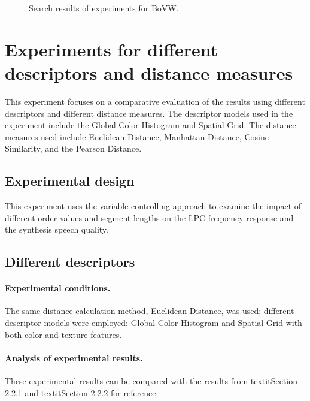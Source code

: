 \documentclass{article}
\begin{document}
\begin{figure}[!tbp]
  \centering
  \hfill
  \hfill
  \caption{\label{fig:BoVWResult} Search results of experiments for BoVW.}
\end{figure}


\section{Experiments for different descriptors and distance measures}

This experiment focuses on a comparative evaluation of the results using different descriptors and different distance measures. The descriptor models used in the experiment include the Global Color Histogram and Spatial Grid. The distance measures used include Euclidean Distance, Manhattan Distance, Cosine Similarity, and the Pearson Distance.

\subsection{Experimental design}

This experiment uses the variable-controlling approach to examine the impact of different order values and segment lengths on the LPC frequency response and the synthesis speech quality.


\subsection{Different descriptors}

\paragraph{Experimental conditions.}
The same distance calculation method, Euclidean Distance, was used; different descriptor models were employed: Global Color Histogram and Spatial Grid with both color and texture features.

\paragraph{Analysis of experimental results.}

These experimental results can be compared with the results from textit{Section 2.2.1} and textit{Section 2.2.2} for reference.
\end{document}
